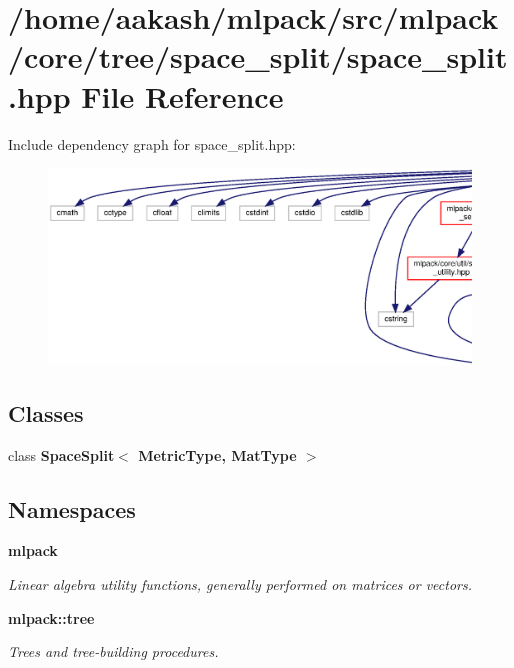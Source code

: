 \section{/home/aakash/mlpack/src/mlpack/core/tree/space\+\_\+split/space\+\_\+split.hpp File Reference}
\label{space__split_8hpp}
Include dependency graph for space\+\_\+split.\+hpp\+:
\nopagebreak
\begin{figure}[H]
\begin{center}
\leavevmode
\includegraphics[width=350pt]{space__split_8hpp__incl}
\end{center}
\end{figure}
\subsection*{Classes}
\begin{DoxyCompactItemize}
\item 
class \textbf{ Space\+Split$<$ Metric\+Type, Mat\+Type $>$}
\end{DoxyCompactItemize}
\subsection*{Namespaces}
\begin{DoxyCompactItemize}
\item 
 \textbf{ mlpack}
\begin{DoxyCompactList}\small\item\em Linear algebra utility functions, generally performed on matrices or vectors. \end{DoxyCompactList}\item 
 \textbf{ mlpack\+::tree}
\begin{DoxyCompactList}\small\item\em Trees and tree-\/building procedures. \end{DoxyCompactList}\end{DoxyCompactItemize}


